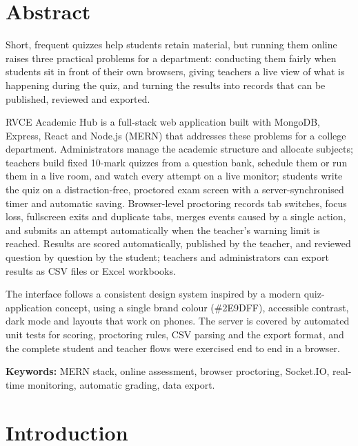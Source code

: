 \documentclass[12pt,a4paper,oneside]{report}
\newcommand{\appname}{RVCE Academic Hub}
\begin{document}
\chapter*{Abstract}
Short, frequent quizzes help students retain material, but running them online raises three practical problems for a
department: conducting them fairly when students sit in front of their own browsers, giving teachers a live view of
what is happening during the quiz, and turning the results into records that can be published, reviewed and exported.

\appname{} is a full-stack web application built with MongoDB, Express, React and Node.js (MERN) that addresses these
problems for a college department. Administrators manage the academic structure and allocate subjects; teachers build
fixed 10-mark quizzes from a question bank, schedule them or run them in a live room, and watch every attempt on a live
monitor; students write the quiz on a distraction-free, proctored exam screen with a server-synchronised timer and
automatic saving. Browser-level proctoring records tab switches, focus loss, fullscreen exits and duplicate tabs,
merges events caused by a single action, and submits an attempt automatically when the teacher's warning limit is
reached. Results are scored automatically, published by the teacher, and reviewed question by question by the student;
teachers and administrators can export results as CSV files or Excel workbooks.

The interface follows a consistent design system inspired by a modern quiz-application concept, using a single brand
colour (\#2E9DFF), accessible contrast, dark mode and layouts that work on phones. The server is covered by automated
unit tests for scoring, proctoring rules, CSV parsing and the export format, and the complete student and teacher flows
were exercised end to end in a browser.

\noindent\textbf{Keywords:} MERN stack, online assessment, browser proctoring, Socket.IO, real-time monitoring,
automatic grading, data export.

\tableofcontents
\listoffigures
\listoftables

\cleardoublepage
{}

\chapter{Introduction}
\label{ch:intro}
\end{document}
